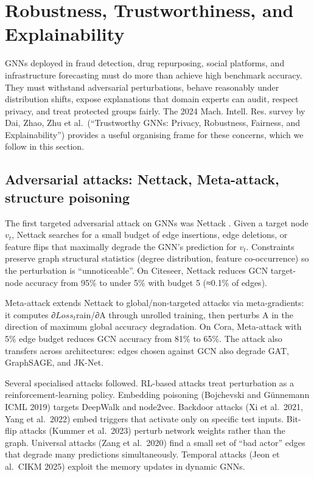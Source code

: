 \documentclass{article}
\begin{document}
\section{Robustness, Trustworthiness, and Explainability}\label{sec:robustness-trustworthiness-and-explainability}
GNNs deployed in fraud detection, drug repurposing, social platforms, and infrastructure forecasting must do more than achieve high benchmark accuracy. They must withstand adversarial perturbations, behave reasonably under distribution shifts, expose explanations that domain experts can audit, respect privacy, and treat protected groups fairly. The 2024 Mach. Intell. Res. survey by Dai, Zhao, Zhu et al.~(``Trustworthy GNNs: Privacy, Robustness, Fairness, and Explainability'') provides a useful organising frame for these concerns, which we follow in this section.

\subsection{Adversarial attacks: Nettack, Meta-attack, structure poisoning}\label{adversarial-attacks-nettack-meta-attack-structure-poisoning}

The first targeted adversarial attack on GNNs was Nettack \citep{zgner2018adversarialattacks}. Given a target node \(v_t\), Nettack searches for a small budget of edge insertions, edge deletions, or feature flips that maximally degrade the GNN's prediction for \(v_t\). Constraints preserve graph structural statistics (degree distribution, feature co-occurrence) so the perturbation is ``unnoticeable''. On Citeseer, Nettack reduces GCN target-node accuracy from 95\% to under 5\% with budget 5 (≈0.1\% of edges).

Meta-attack \citep{zgner2018adversarialattacks} extends Nettack to global/non-targeted attacks via meta-gradients: it computes ∂\(Loss_t\)rain/∂A through unrolled training, then perturbs A in the direction of maximum global accuracy degradation. On Cora, Meta-attack with 5\% edge budget reduces GCN accuracy from 81\% to 65\%. The attack also transfers across architectures: edges chosen against GCN also degrade GAT, GraphSAGE, and JK-Net.

Several specialised attacks followed. RL-based attacks \citep{dai2018adversarialattacko} treat perturbation as a reinforcement-learning policy. Embedding poisoning (Bojchevski and Günnemann ICML 2019) targets DeepWalk and node2vec. Backdoor attacks (Xi et al.~2021, Yang et al.~2022) embed triggers that activate only on specific test inputs. Bit-flip attacks (Kummer et al.~2023) perturb network weights rather than the graph. Universal attacks (Zang et al.~2020) find a small set of ``bad actor'' edges that degrade many predictions simultaneously. Temporal attacks (Jeon et al.~CIKM 2025) exploit the memory updates in dynamic GNNs.
\end{document}
